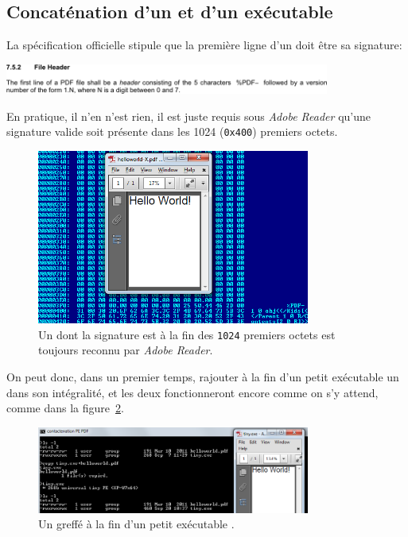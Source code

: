 \subsection{Concaténation d'un \PDF et d'un exécutable}

La spécification officielle stipule que la première ligne d'un \PDF doit être sa signature:
\begin{center}
  \includegraphics[width=0.8\textwidth]{albertini/img/pdfsigtheory}
\end{center}

En pratique, il n'en n'est rien, il est juste requis sous \emph{Adobe Reader} qu'une signature valide soit présente dans les 1024 (\texttt{0x400}) premiers octets.

\begin{figure}[ht]
  \centering
  \includegraphics[width=0.8\textwidth]{albertini/img/pdfsigpractice}
  \caption{Un \PDF dont la signature est à la fin des \texttt{1024} premiers octets est toujours reconnu par \emph{Adobe Reader}.}
  \label{fig:albertini:pdfsigpractice}
\end{figure}

On peut donc, dans un premier temps, rajouter à la fin d'un petit exécutable un \PDF dans son intégralité, et les deux fonctionneront encore comme on s'y attend, comme dans la figure~\ref{fig:albertini:tinyPEPDF}.

\begin{figure}[ht]
  \centering
  \includegraphics[width=0.8\textwidth]{albertini/img/tinyPEPDF}
  \caption{Un \PDF greffé à la fin d'un petit exécutable \PE.}
  \label{fig:albertini:tinyPEPDF}
\end{figure}


